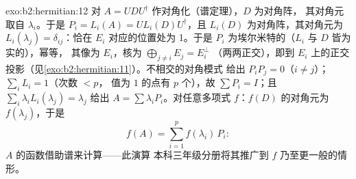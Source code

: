 \begin{solution}{exo:b2:hermitian:12}
对 $A = U D U^\dagger$ 作对角化（谱定理），$D$ 为对角阵，
其对角元取自 $\lambda_i$。于是 $P_i = L_i(A) = U
L_i(D)U^\dagger$，且 $L_i(D)$ 为对角阵，其对角元为
$L_i(\lambda_j) = \delta_{ij}$：恰在
$E_i$ 对应的位置处为 1。于是 $P_i$ 为埃尔米特的（$L_i$ 与 $D$ 皆为实的），幂等，
其像为 $E_i$，核为 $\bigoplus_{j\neq i}E_j = E_i^\perp$
（两两正交），即到
$E_i$ 上的正交投影（见\cref{exo:b2:hermitian:11}）。不相交的对角模式
给出 $P_iP_j = 0$（$i \neq j$）；$\sum_i L_i = 1$（次数 $< p$，
值为 $1$ 的点有 $p$ 个），故 $\sum P_i = I$；且 $\sum_i
\lambda_iL_i(\lambda_j) = \lambda_j$ 给出 $A = \sum
\lambda_iP_i$。对任意多项式 $f$：$f(D)$ 的对角元为
$f(\lambda_j)$，于是
\[
f(A) = \sum_{i=1}^{p} f(\lambda_i)\,P_i :
\]
$A$ 的函数借助谱来计算——此演算
本科三年级分册将其推广到 $f$ 乃至更一般的情形。
\end{solution}

